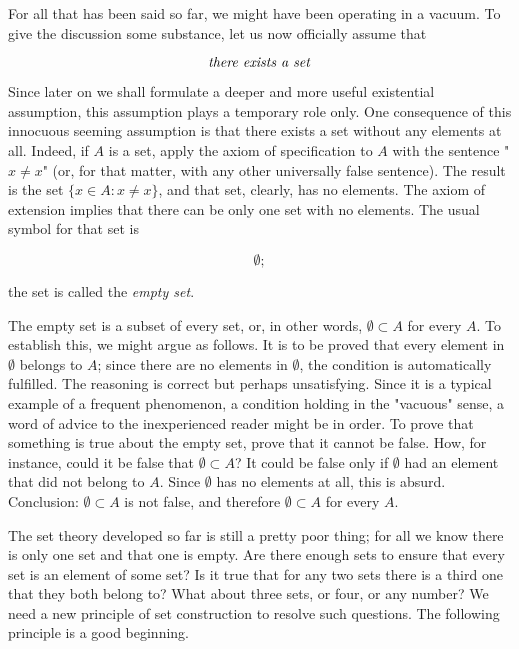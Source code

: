 
For all that has been said so far, we might have been operating in a vacuum. To give the discussion some substance, let us now officially assume that

\begin{equation*}
\text{ \textit{there exists a set} }
\end{equation*}
 
Since later on we shall formulate a deeper and more useful existential assumption, this  assumption  plays  a temporary role only. One consequence of this innocuous seeming assumption is that there exists a set without any elements at all. Indeed, if $A$ is a set, apply the axiom of specification to $A$ with the sentence "$ x \neq x $"  (or, for that matter, with any other universally false sentence). The result is the set $\{x \in A: x \neq x\}$, and that set, clearly, has no elements. The axiom of extension implies that there can be only one set with no elements. The usual symbol for that set is 

\begin{equation*}
\emptyset ;
\end{equation*}


the set is called the \textit{empty set}. 

The empty set is a subset of every set, or, in other words, $\emptyset \subset A$ for every $A$. To establish this, we might argue as follows. It is to be proved that every element in $ \emptyset $ belongs to $A$; since there are no elements in $ \emptyset $, the condition is automatically fulfilled. The reasoning is correct but perhaps unsatisfying. Since it is a typical example of a frequent phenomenon, a condition holding in the "vacuous" sense, a word of advice to the inexperienced reader might be in order. To prove that something is true about the empty set, prove that it cannot be false. How, for instance, could it be false that $ \emptyset \subset A$? It could be false only if $ \emptyset $ had an element that did not belong to $A$. Since $ \emptyset $ has no elements at all, this is absurd. Conclusion: $ \emptyset \subset A$ is not false, and therefore $ \emptyset \subset A$ for every $A$.

The set theory developed so far is still a pretty poor thing; for all we know there is only one set and that one is empty. Are there enough sets to ensure that every set is an element of some set? Is it true that for any two sets there is a third one that they both belong to? What about three sets, or four, or any number? We need a new principle of set construction to resolve such questions. The following principle is a good beginning. 

